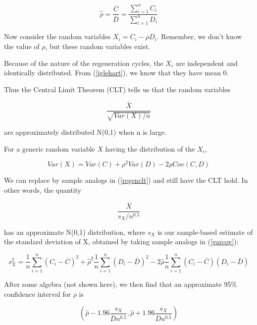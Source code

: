 \begin{equation}
\hat{\rho} =
\frac
{\overline{C}}  %
{\overline{D}}
= 
\frac
{\sum_{i=1}^{n} C_i}
{\sum_{i=1}^{n} D_i}
\end{equation}

Now consider the random variables $X_i = C_i - \rho D_i$.  Remember, we
don't know the value of $\rho$, but these random variables exist.  

Because of the nature of the regeneration cycles, the $X_i$ are
independent and identically distributed.  From (\ref{iglehart}), we know
that they have mean 0.  

Thus the Central Limit Theorem (CLT) tells us that the random variables

\begin{equation}
\label{regenclt}
\frac
{\overline{X}}
{\sqrt{Var(X)/n}}
\end{equation}

are approximately distributed N(0,1) when n is large.  

For a generic random variable $X$ having the distribution of the $X_i$,

\begin{equation}
\label{varcov}
Var(X) = Var(C) + \rho^2 Var(D) - 2\rho Cov(C,D)
\end{equation}

We can replace by sample analogs in (\ref{regenclt}) and still have the
CLT hold.  In other words, the quantity

\begin{equation}
\label{regenclt2}
\frac
{\overline{X}}
{s_X/n^{0.5}}
\end{equation}

has an approximate N(0,1) distribution, where $s_X$ is our sample-based
estimate of the standard deviation of X, obtained by taking sample
analogs in (\ref{varcov}):  

\begin{equation}
s^2_X = \frac{1}{n} \sum_{i=1}^n (C_i - \bar{C})^2 +
\hat{\rho}^2  \frac{1}{n} \sum_{i=1}^n (D_i - \bar{D})^2 -
2 \hat{\rho} \frac{1}{n} \sum_{i=1}^n (C_i - \bar{C}) (D_i - \bar{D})
\end{equation}

After some algebra (not shown here), we then find that an approximate
95\% confidence interval for $\rho$ is

\begin{equation}
\label{rhoci}
(\hat{\rho} - 1.96 \frac{s_X}{\overline{D} n^{0.5}},
\hat{\rho} + 1.96 \frac{s_X}{\overline{D} n^{0.5}})
\end{equation}

